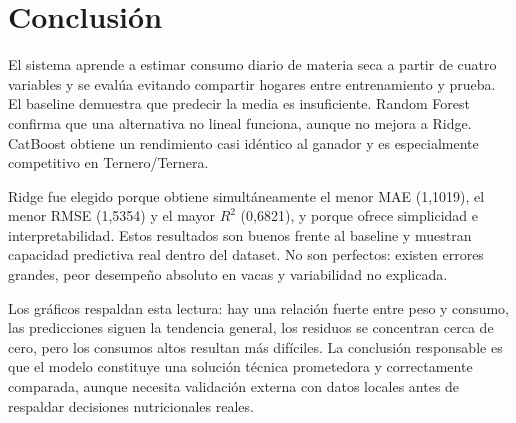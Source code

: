 \documentclass[11pt,a4paper]{article}
\begin{document}
\section{Conclusión}

El sistema aprende a estimar consumo diario de materia seca a partir de cuatro variables y se evalúa evitando compartir hogares entre entrenamiento y prueba. El baseline demuestra que predecir la media es insuficiente. Random Forest confirma que una alternativa no lineal funciona, aunque no mejora a Ridge. CatBoost obtiene un rendimiento casi idéntico al ganador y es especialmente competitivo en Ternero/Ternera.

Ridge fue elegido porque obtiene simultáneamente el menor MAE (1,1019), el menor RMSE (1,5354) y el mayor $R^2$ (0,6821), y porque ofrece simplicidad e interpretabilidad. Estos resultados son buenos frente al baseline y muestran capacidad predictiva real dentro del dataset. No son perfectos: existen errores grandes, peor desempeño absoluto en vacas y variabilidad no explicada.

Los gráficos respaldan esta lectura: hay una relación fuerte entre peso y consumo, las predicciones siguen la tendencia general, los residuos se concentran cerca de cero, pero los consumos altos resultan más difíciles. La conclusión responsable es que el modelo constituye una solución técnica prometedora y correctamente comparada, aunque necesita validación externa con datos locales antes de respaldar decisiones nutricionales reales.
\end{document}
